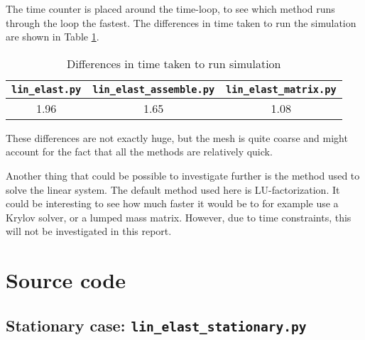 \documentclass[twoside]{article}
\begin{document}
The time counter is placed around the time-loop, to see which method runs through the loop the fastest. The differences in time taken to run the simulation are shown in Table \ref{time:table}.
\begin{table}[h!]
\begin{center}
\begin{tabular}{|c|c|c|}
\hline
\texttt{lin\_elast.py} & \texttt{lin\_elast\_assemble.py} & \texttt{lin\_elast\_matrix.py}  \\
\hline 
1.96 & 1.65 & 1.08\\
\hline
\end{tabular}
\end{center}
\caption{Differences in time taken to run simulation}
\label{time:table}
\end{table}

These differences are not exactly huge, but the mesh is quite coarse and might account for the fact that all the methods are relatively quick.

Another thing that could be possible to investigate further is the method used to solve the linear system. The default method used here is LU-factorization. It could be interesting to see how much faster it would be to for example use a Krylov solver, or a lumped mass matrix. However, due to time constraints, this will not be investigated in this report.


\newpage
\appendix
\section{Source code}

\subsection{Stationary case: \texttt{lin\_elast\_stationary.py}}
\label{stationary:code}
\end{document}
